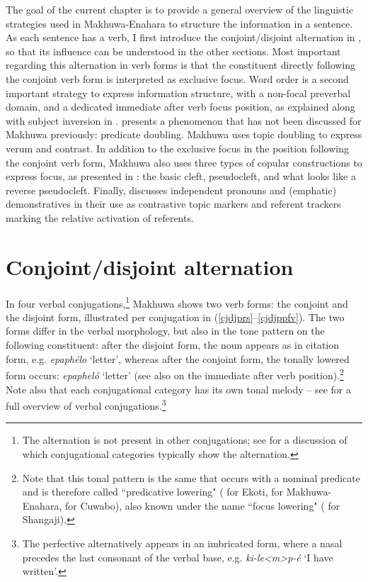 \documentclass[output=paper]{langscibook}
\begin{document}
The goal of the current chapter is to provide a general overview of the linguistic strategies used in Makhuwa\hyp Enahara to structure the information in a sentence. As each sentence has a verb, I first introduce the conjoint\slash disjoint alternation in , so that its influence can be understood in the other sections. Most important regarding this alternation in verb forms is that the constituent directly following the conjoint verb form is interpreted as exclusive focus. Word order is a second important strategy to express information structure, with a non-focal preverbal domain, and a dedicated immediate after verb focus position, as explained along with subject inversion in .  presents a phenomenon that has not been discussed for Makhuwa previously: predicate doubling. Makhuwa uses topic doubling to express verum and contrast. In addition to the exclusive focus in the position following the conjoint verb form, Makhuwa also uses three types of copular constructions to express focus, as presented in : the basic cleft, pseudocleft, and what looks like a reverse pseudocleft. Finally,  discusses independent pronouns and (emphatic) demonstratives in their use as contrastive topic markers and referent trackers marking the relative activation of referents.

\section{Conjoint/disjoint alternation}
\label{bkm:Ref95378676}
In four verbal conjugations,\footnote{The alternation is not present in other conjugations; see \citet{vanderWal2017} for a discussion of which conjugational categories typically show the alternation.} Makhuwa shows two verb forms: the conjoint and the disjoint form, illustrated per conjugation in (\ref{cjdjprs}--\ref{cjdjppfv}). The two forms differ in the verbal morphology, but also in the tone pattern on the following constituent: after the disjoint form, the noun appears as in citation form, e.g. \textit{epaphélo} ‘letter’, whereas after the conjoint form, the tonally lowered form occurs: \textit{epapheló} ‘letter’ (see also  on the immediate after verb position).\footnote{\label{fn:makhuwa:predlow}Note that this tonal pattern is the same that occurs with a nominal predicate and is therefore called ``predicative lowering" (\citealt{SchadebergMucanheia2000} for Ekoti, \citealt{vanderWal2006} for Makhuwa-Enahara, \citealt{Guérois2015} for Cuwabo), also known under the name ``focus lowering" (\citealt{Devos2017} for Shangaji).} Note also that each conjugational category has its own tonal melody – see \citet[89--91]{vanderWal2009a} for a full overview of verbal conjugations.\footnote{\label{fn:makhuwa:pfv-imbricated}The perfective alternatively appears in an imbricated form, where a nasal precedes the last consonant of the verbal base, e.g. \textit{ki-le<m>p-é} ‘I have written’.}
\end{document}
